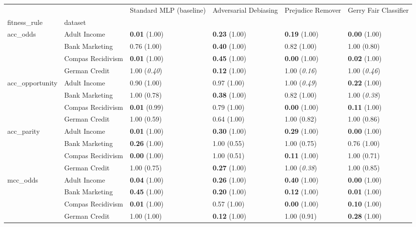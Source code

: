 \begin{tabular}{llllll}
\toprule
 &  & Standard MLP (baseline) & Adversarial Debiasing & Prejudice Remover & Gerry Fair Classifier \\
fitness_rule & dataset &  &  &  &  \\
\midrule
\multirow[t]{4}{*}{acc_odds} & Adult Income & \textbf{0.01} (1.00) & \textbf{0.23} (1.00) & \textbf{0.19} (1.00) & \textbf{0.00} (1.00) \\
 & Bank Marketing & 0.76 (1.00) & \textbf{0.40} (1.00) & 0.82 (1.00) & 1.00 (0.80) \\
 & Compas Recidivism & \textbf{0.01} (1.00) & \textbf{0.45} (1.00) & \textbf{0.00} (1.00) & \textbf{0.02} (1.00) \\
 & German Credit & 1.00 (\textit{0.40}) & \textbf{0.12} (1.00) & 1.00 (\textit{0.16}) & 1.00 (\textit{0.46}) \\
\cline{1-6}
\multirow[t]{4}{*}{acc_opportunity} & Adult Income & 0.90 (1.00) & 0.97 (1.00) & 1.00 (\textit{0.49}) & \textbf{0.22} (1.00) \\
 & Bank Marketing & 1.00 (0.78) & \textbf{0.38} (1.00) & 0.82 (1.00) & 1.00 (\textit{0.38}) \\
 & Compas Recidivism & \textbf{0.01} (0.99) & 0.79 (1.00) & \textbf{0.00} (1.00) & \textbf{0.11} (1.00) \\
 & German Credit & 1.00 (0.59) & 0.64 (1.00) & 1.00 (0.82) & 1.00 (0.86) \\
\cline{1-6}
\multirow[t]{4}{*}{acc_parity} & Adult Income & \textbf{0.01} (1.00) & \textbf{0.30} (1.00) & \textbf{0.29} (1.00) & \textbf{0.00} (1.00) \\
 & Bank Marketing & \textbf{0.26} (1.00) & 1.00 (0.55) & 1.00 (0.75) & 0.76 (1.00) \\
 & Compas Recidivism & \textbf{0.00} (1.00) & 1.00 (0.51) & \textbf{0.11} (1.00) & 1.00 (0.71) \\
 & German Credit & 1.00 (0.75) & \textbf{0.27} (1.00) & 1.00 (\textit{0.38}) & 1.00 (0.85) \\
\cline{1-6}
\multirow[t]{4}{*}{mcc_odds} & Adult Income & \textbf{0.04} (1.00) & \textbf{0.26} (1.00) & \textbf{0.40} (1.00) & \textbf{0.00} (1.00) \\
 & Bank Marketing & \textbf{0.45} (1.00) & \textbf{0.20} (1.00) & \textbf{0.12} (1.00) & \textbf{0.01} (1.00) \\
 & Compas Recidivism & \textbf{0.01} (1.00) & 0.57 (1.00) & \textbf{0.00} (1.00) & \textbf{0.10} (1.00) \\
 & German Credit & 1.00 (1.00) & \textbf{0.12} (1.00) & 1.00 (0.91) & \textbf{0.28} (1.00) \\

\end{tabular}
